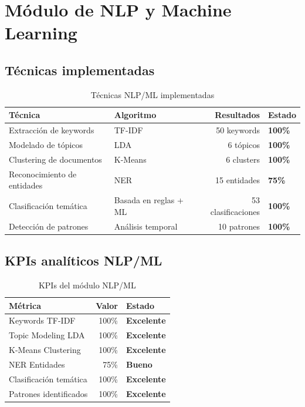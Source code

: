 \documentclass[11pt,a4paper]{article}
\begin{document}
\section{Módulo de NLP y Machine Learning}

\subsection{Técnicas implementadas}

\begin{table}[H]
\centering
\begin{tabularx}{\textwidth}{l l r l}
\toprule
\textbf{Técnica} & \textbf{Algoritmo} & \textbf{Resultados} & \textbf{Estado} \\
\midrule
Extracción de keywords & TF-IDF & 50 keywords & \textcolor{successgreen}{\textbf{100\%}} \\
\rowcolor{tablerow}
Modelado de tópicos & LDA & 6 tópicos & \textcolor{successgreen}{\textbf{100\%}} \\
Clustering de documentos & K-Means & 6 clusters & \textcolor{successgreen}{\textbf{100\%}} \\
\rowcolor{tablerow}
Reconocimiento de entidades & NER & 15 entidades & \textcolor{successgreen}{\textbf{75\%}} \\
Clasificación temática & Basada en reglas + ML & 53 clasificaciones & \textcolor{successgreen}{\textbf{100\%}} \\
\rowcolor{tablerow}
Detección de patrones & Análisis temporal & 10 patrones & \textcolor{successgreen}{\textbf{100\%}} \\
\bottomrule
\end{tabularx}
\caption{Técnicas NLP/ML implementadas}
\end{table}

\subsection{KPIs analíticos NLP/ML}

\begin{table}[H]
\centering
\begin{tabularx}{\textwidth}{X r l}
\toprule
\textbf{Métrica} & \textbf{Valor} & \textbf{Estado} \\
\midrule
Keywords TF-IDF & 100\% & \textcolor{successgreen}{\textbf{Excelente}} \\
\rowcolor{tablerow}
Topic Modeling LDA & 100\% & \textcolor{successgreen}{\textbf{Excelente}} \\
K-Means Clustering & 100\% & \textcolor{successgreen}{\textbf{Excelente}} \\
\rowcolor{tablerow}
NER Entidades & 75\% & \textcolor{successgreen}{\textbf{Bueno}} \\
Clasificación temática & 100\% & \textcolor{successgreen}{\textbf{Excelente}} \\
\rowcolor{tablerow}
Patrones identificados & 100\% & \textcolor{successgreen}{\textbf{Excelente}} \\
\bottomrule
\end{tabularx}
\caption{KPIs del módulo NLP/ML}
\end{table}
\end{document}

